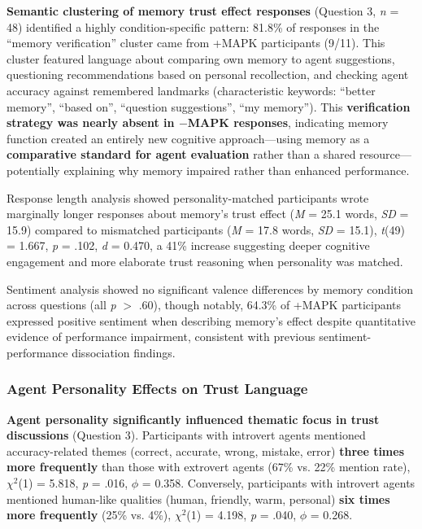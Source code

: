 \documentclass[12pt]{article}
\begin{document}
\textbf{Semantic clustering of memory trust effect responses} (Question 3, \textit{n} = 48) identified a highly condition-specific pattern: 81.8\% of responses in the ``memory verification'' cluster came from +MAPK participants (9/11). This cluster featured language about comparing own memory to agent suggestions, questioning recommendations based on personal recollection, and checking agent accuracy against remembered landmarks (characteristic keywords: ``better memory'', ``based on'', ``question suggestions'', ``my memory''). This \textbf{verification strategy was nearly absent in $-$MAPK responses}, indicating memory function created an entirely new cognitive approach—using memory as a \textbf{comparative standard for agent evaluation} rather than a shared resource—potentially explaining why memory impaired rather than enhanced performance.

Response length analysis showed personality-matched participants wrote marginally longer responses about memory's trust effect (\textit{M} = 25.1 words, \textit{SD} = 15.9) compared to mismatched participants (\textit{M} = 17.8 words, \textit{SD} = 15.1), \textit{t}(49) = 1.667, \textit{p} = .102, \textit{d} = 0.470, a 41\% increase suggesting deeper cognitive engagement and more elaborate trust reasoning when personality was matched.

Sentiment analysis showed no significant valence differences by memory condition across questions (all \textit{p} $>$ .60), though notably, 64.3\% of +MAPK participants expressed positive sentiment when describing memory's effect despite quantitative evidence of performance impairment, consistent with previous sentiment-performance dissociation findings.

\subsubsection{Agent Personality Effects on Trust Language}

\textbf{Agent personality significantly influenced thematic focus in trust discussions} (Question 3). Participants with introvert agents mentioned accuracy-related themes (correct, accurate, wrong, mistake, error) \textbf{three times more frequently} than those with extrovert agents (67\% vs. 22\% mention rate), $\chi^2$(1) = 5.818, \textit{p} = .016, $\phi$ = 0.358. Conversely, participants with introvert agents mentioned human-like qualities (human, friendly, warm, personal) \textbf{six times more frequently} (25\% vs. 4\%), $\chi^2$(1) = 4.198, \textit{p} = .040, $\phi$ = 0.268.
\end{document}
